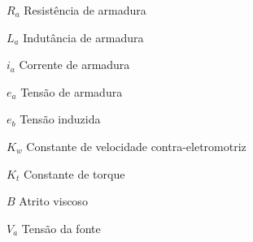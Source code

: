 \begin{simbolos}
  \item[$R_a$] Resistência de armadura
  \item[$L_a$] Indutância de armadura
  \item[$i_a$] Corrente de armadura
  \item[$e_a$] Tensão de armadura
  \item[$e_b$] Tensão induzida
  \item[$K_w$] Constante de velocidade contra-eletromotriz 
  \item[$K_t$] Constante de torque
  \item[$B$] Atrito viscoso
  \item[$V_a$] Tensão da fonte
\end{simbolos}